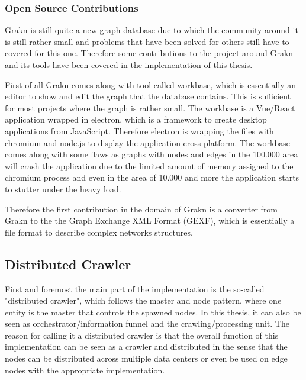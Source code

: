 \subsubsection{Open Source Contributions}
Grakn is still quite a new graph database due to which the community around it is still rather small and problems that have been solved for others still have to covered for this one. Therefore some contributions to the project around Grakn and its tools have been covered in the implementation of this thesis.

First of all Grakn comes along with tool called workbase, which is essentially an editor to show and edit the graph that the database contains. This is sufficient for most projects where the graph is rather small. The workbase is a Vue/React application wrapped in electron, which is a framework to create desktop applications from JavaScript. Therefore electron is wrapping the files with chromium and node.js to display the application cross platform. The workbase comes along with some flaws as graphs with nodes and edges in the 100.000 area will crash the application due to the limited amount of memory assigned to the chromium process and even in the area of 10.000 and more the application starts to stutter under the heavy load.

Therefore the first contribution in the domain of Grakn is a converter from Grakn to the the Graph Exchange XML Format (GEXF), which is essentially a file format to describe complex networks structures.

\subsection{Distributed Crawler}
First and foremost the main part of the implementation is the so-called "distributed crawler", which follows the master and node pattern, where one entity is the master that controls the spawned nodes. In this thesis, it can also be seen as orchestrator/information funnel and the crawling/processing unit. The reason for calling it a distributed crawler is that the overall function of this implementation can be seen as a crawler and distributed in the sense that the nodes can be distributed across multiple data centers or even be used on edge nodes with the appropriate implementation.

